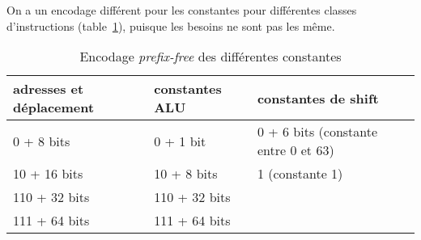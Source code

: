 \documentclass[architecture]{compas2018}
\begin{document}
On a un encodage différent pour les constantes pour différentes classes d'instructions (table~\ref{tab:constantes}), puisque les besoins ne sont pas les même.


\begin{table}
  \label{tab:constantes}
  \centering
  \caption{Encodage \emph{prefix-free} des différentes constantes}
  \begin{tabular}{|l||l||l|}
    \hline
    adresses et déplacement & constantes ALU & constantes de shift                   \\
    \hline
    0 + 8 bits              & 0 + 1 bit      & 0 + 6 bits  (constante entre 0 et 63) \\
    \hline         
    10 + 16 bits            & 10 + 8 bits    & 1  (constante 1)                      \\
    \hline                  
    110 + 32 bits           & 110 + 32 bits  &                                       \\
    \hline                  
    111 + 64 bits           & 111 + 64 bits  &                                       \\
    \hline
  \end{tabular}
\end{table}
\end{document}
